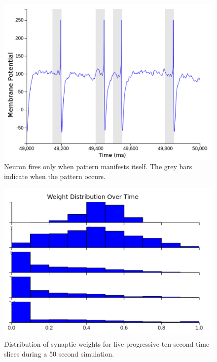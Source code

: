 \documentclass[a4paper,11pt]{article}
\begin{document}
\begin{figure}[H]
\centering
\includegraphics[scale = 0.4]{pr1}
\caption{Neuron fires only when pattern manifests itself. The grey bars indicate when the pattern occurs.}
\end{figure}

\begin{figure}[H]
\centering
\includegraphics[scale = 0.35]{pr2}
\caption{Distribution of synaptic weights for five progressive ten-second time slices during a 50 second simulation.}
\end{figure}
\end{document}
